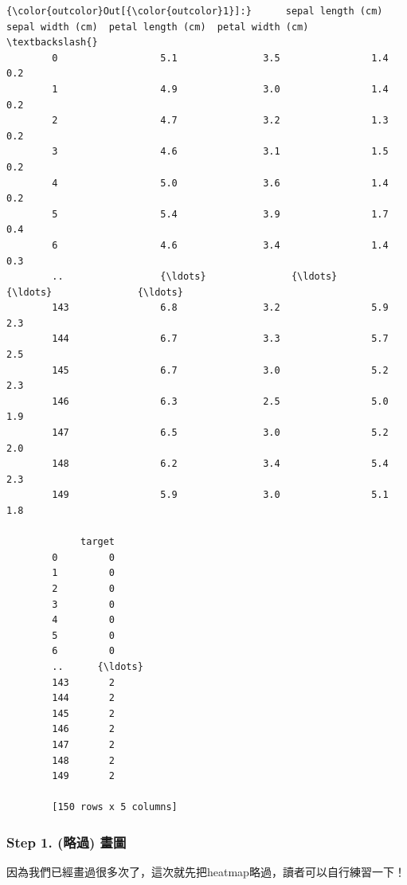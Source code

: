 \documentclass[11pt]{ctexart}
\begin{document}
\begin{Verbatim}[commandchars=\\\{\}]
{\color{outcolor}Out[{\color{outcolor}1}]:}      sepal length (cm)  sepal width (cm)  petal length (cm)  petal width (cm)  \textbackslash{}
        0                  5.1               3.5                1.4               0.2   
        1                  4.9               3.0                1.4               0.2   
        2                  4.7               3.2                1.3               0.2   
        3                  4.6               3.1                1.5               0.2   
        4                  5.0               3.6                1.4               0.2   
        5                  5.4               3.9                1.7               0.4   
        6                  4.6               3.4                1.4               0.3   
        ..                 {\ldots}               {\ldots}                {\ldots}               {\ldots}   
        143                6.8               3.2                5.9               2.3   
        144                6.7               3.3                5.7               2.5   
        145                6.7               3.0                5.2               2.3   
        146                6.3               2.5                5.0               1.9   
        147                6.5               3.0                5.2               2.0   
        148                6.2               3.4                5.4               2.3   
        149                5.9               3.0                5.1               1.8   
        
             target  
        0         0  
        1         0  
        2         0  
        3         0  
        4         0  
        5         0  
        6         0  
        ..      {\ldots}  
        143       2  
        144       2  
        145       2  
        146       2  
        147       2  
        148       2  
        149       2  
        
        [150 rows x 5 columns]
\end{Verbatim}
            
    \hypertarget{step-1.-ux7565ux904e-ux756bux5716}{%
\subsubsection{Step 1. (略過)
畫圖}\label{step-1.-ux7565ux904e-ux756bux5716}}

因為我們已經畫過很多次了，這次就先把heatmap略過，讀者可以自行練習一下！
\end{document}
